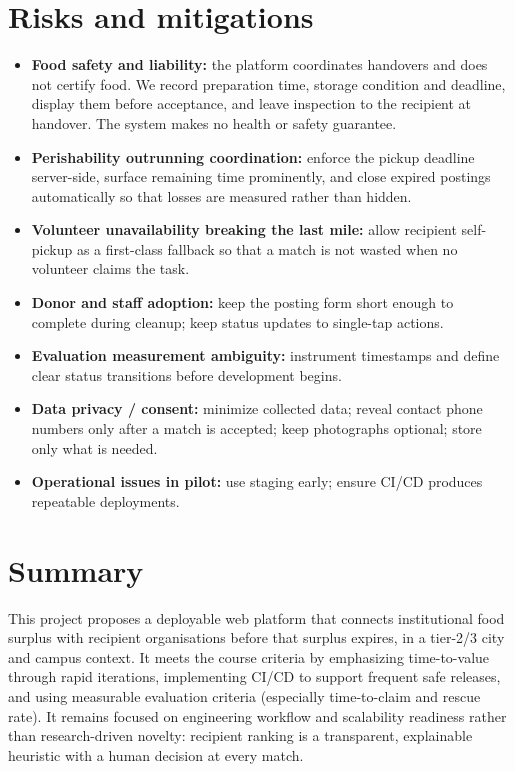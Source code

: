 \documentclass[11pt,a4paper]{article}
\begin{document}
\section{Risks and mitigations}
\begin{itemize}[leftmargin=0.7cm]
    \item \textbf{Food safety and liability:} the platform coordinates handovers and does not certify food. We record preparation time, storage condition and deadline, display them before acceptance, and leave inspection to the recipient at handover. The system makes no health or safety guarantee.
    \item \textbf{Perishability outrunning coordination:} enforce the pickup deadline server-side, surface remaining time prominently, and close expired postings automatically so that losses are measured rather than hidden.
    \item \textbf{Volunteer unavailability breaking the last mile:} allow recipient self-pickup as a first-class fallback so that a match is not wasted when no volunteer claims the task.
    \item \textbf{Donor and staff adoption:} keep the posting form short enough to complete during cleanup; keep status updates to single-tap actions.
    \item \textbf{Evaluation measurement ambiguity:} instrument timestamps and define clear status transitions before development begins.
    \item \textbf{Data privacy / consent:} minimize collected data; reveal contact phone numbers only after a match is accepted; keep photographs optional; store only what is needed.
    \item \textbf{Operational issues in pilot:} use staging early; ensure CI/CD produces repeatable deployments.
\end{itemize}

\section{Summary}
This project proposes a deployable web platform that connects institutional food surplus with recipient organisations before that surplus expires, in a tier-2/3 city and campus context. It meets the course criteria by emphasizing time-to-value through rapid iterations, implementing CI/CD to support frequent safe releases, and using measurable evaluation criteria (especially time-to-claim and rescue rate). It remains focused on engineering workflow and scalability readiness rather than research-driven novelty: recipient ranking is a transparent, explainable heuristic with a human decision at every match.
\end{document}
